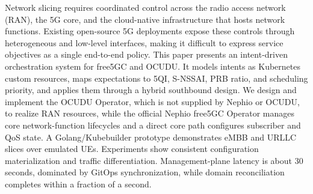 Network slicing requires coordinated control across the radio access network (RAN), the 5G core, and the cloud-native infrastructure that hosts network functions. Existing open-source 5G deployments expose these controls through heterogeneous and low-level interfaces, making it difficult to express service objectives as a single end-to-end policy. This paper presents an intent-driven orchestration system for free5GC and OCUDU. It models intents as Kubernetes custom resources, maps expectations to 5QI, S-NSSAI, PRB ratio, and scheduling priority, and applies them through a hybrid southbound design. We design and implement the OCUDU Operator, which is not supplied by Nephio or OCUDU, to realize RAN resources, while the official Nephio free5GC Operator manages core network-function lifecycles and a direct core path configures subscriber and QoS state. A Golang/Kubebuilder prototype demonstrates eMBB and URLLC slices over emulated UEs. Experiments show consistent configuration materialization and traffic differentiation. Management-plane latency is about 30 seconds, dominated by GitOps synchronization, while domain reconciliation completes within a fraction of a second.
